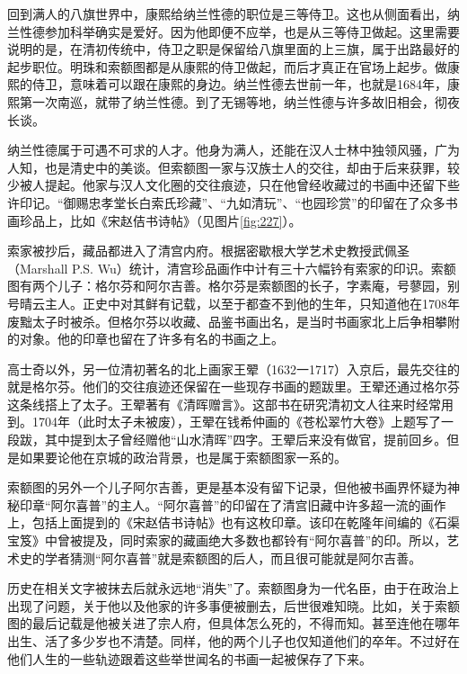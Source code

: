 
回到满人的八旗世界中，康熙给纳兰性德的职位是三等侍卫。这也从侧面看出，纳兰性德参加科举确实是爱好。因为他即便不应举，也是从三等侍卫做起。这里需要说明的是，在清初传统中，侍卫之职是保留给八旗里面的上三旗，属于出路最好的起步职位。明珠和索额图都是从康熙的侍卫做起，而后才真正在官场上起步。做康熙的侍卫，意味着可以跟在康熙的身边。纳兰性德去世前一年，也就是1684年，康熙第一次南巡，就带了纳兰性德。到了无锡等地，纳兰性德与许多故旧相会，彻夜长谈。



纳兰性德属于可遇不可求的人才。他身为满人，还能在汉人士林中独领风骚，广为人知，也是清史中的美谈。但索额图一家与汉族士人的交往，却由于后来获罪，较少被人提起。他家与汉人文化圈的交往痕迹，只在他曾经收藏过的书画中还留下些许印记。“御赐忠孝堂长白索氏珍藏”、“九如清玩”、“也园珍赏”的印留在了众多书画珍品上，比如《宋赵佶书诗帖》（见图片\ref{fig:227}）。



索家被抄后，藏品都进入了清宫内府。根据密歇根大学艺术史教授武佩圣（Marshall P.S. Wu）统计，清宫珍品画作中计有三十六幅钤有索家的印识。索额图有两个儿子：格尔芬和阿尔吉善。格尔芬是索额图的长子，字素庵，号蓼园，别号晴云主人。正史中对其鲜有记载，以至于都查不到他的生年，只知道他在1708年废黜太子时被杀。但格尔芬以收藏、品鉴书画出名，是当时书画家北上后争相攀附的对象。他的印章也留在了许多有名的书画之上。



高士奇以外，另一位清初著名的北上画家王翚（1632一1717）入京后，最先交往的就是格尔芬。他们的交往痕迹还保留在一些现存书画的题跋里。王翚还通过格尔芬这条线搭上了太子。王翚著有《清晖赠言》。这部书在研究清初文人往来时经常用到。1704年（此时太子未被废），王翚在钱希仲画的《苍松翠竹大卷》上题写了一段跋，其中提到太子曾经赠他“山水清晖”四字。王翚后来没有做官，提前回乡。但是如果要论他在京城的政治背景，也是属于索额图家一系的。



索额图的另外一个儿子阿尔吉善，更是基本没有留下记录，但他被书画界怀疑为神秘印章“阿尔喜普”的主人。“阿尔喜普”的印留在了清宫旧藏中许多超一流的画作上，包括上面提到的《宋赵佶书诗帖》也有这枚印章。该印在乾隆年间编的《石渠宝笈》中曾被提及，同时索家的藏画绝大多数也都铃有“阿尔喜普”的印。所以，艺术史的学者猜测“阿尔喜普”就是索额图的后人，而且很可能就是阿尔吉善。



历史在相关文字被抹去后就永远地“消失”了。索额图身为一代名臣，由于在政治上出现了问题，关于他以及他家的许多事便被删去，后世很难知晓。比如，关于索额图的最后记载是他被关进了宗人府，但具体怎么死的，不得而知。甚至连他在哪年出生、活了多少岁也不清楚。同样，他的两个儿子也仅知道他们的卒年。不过好在他们人生的一些轨迹跟着这些举世闻名的书画一起被保存了下来。


